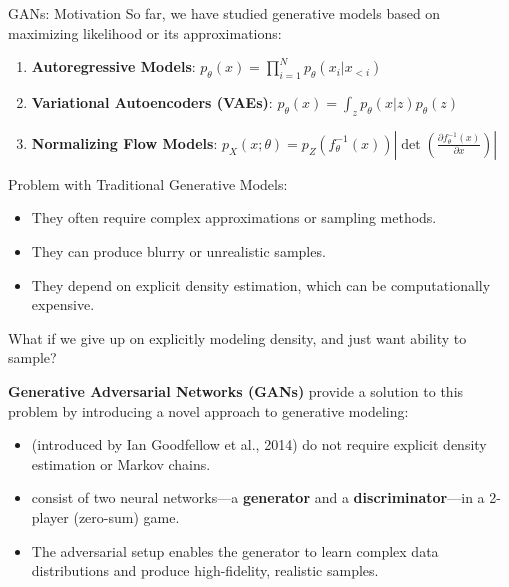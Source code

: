 \begin{frame}[allowframebreaks]{GANs: Motivation}
So far, we have studied generative models based on maximizing likelihood or its approximations:
\begin{enumerate}
    \item \textbf{Autoregressive Models}: $p_\theta(x) = \prod^N_{i=1} p_\theta(x_i|x_{<i})$
    \item \textbf{Variational Autoencoders (VAEs)}: $p_\theta(x) = \int_z p_\theta(x|z) p_\theta(z)$
    \item \textbf{Normalizing Flow Models}: $p_X(x;\theta) = p_Z(f_\theta^{-1}(x)) \left | \det \left( \frac{\partial f_\theta^{-1}(x)}{\partial x} \right )\right |$
\end{enumerate}

\begin{block}{Problem with Traditional Generative Models:}
    \begin{itemize}
        \item They often require complex approximations or sampling methods.
        \item They can produce blurry or unrealistic samples.
        \item They depend on explicit density estimation, which can be computationally expensive.
    \end{itemize}
\end{block}

What if we give up on explicitly modeling density, and just want
ability to sample?

\framebreak

\textbf{Generative Adversarial Networks (GANs)} provide a solution to this problem by introducing a novel approach to generative modeling:
\begin{itemize}
    \item (introduced by Ian Goodfellow et al., 2014) do not require explicit density estimation or Markov chains.
    \item consist of two neural networks—a \textbf{generator} and a \textbf{discriminator}—in a 2-player (zero-sum) game.
    \item The adversarial setup enables the generator to learn complex data distributions and produce high-fidelity, realistic samples.
\end{itemize}

\end{frame}

